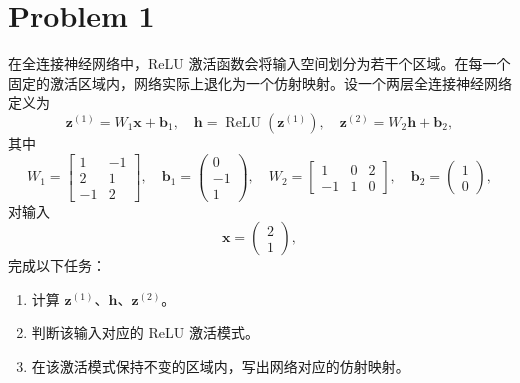 \section*{Problem 1}

在全连接神经网络中，ReLU 激活函数会将输入空间划分为若干个区域。在每一个固定的激活区域内，网络实际上退化为一个仿射映射。设一个两层全连接神经网络定义为
\[
\bm{z}^{(1)} = W_1 \bm{x} + \bm{b}_1,\quad
\bm{h} = \operatorname{ReLU}(\bm{z}^{(1)}),\quad
\bm{z}^{(2)} = W_2 \bm{h} + \bm{b}_2,
\]
其中
\[
W_1 = \begin{bmatrix}
    1 & -1 \\
    2 & 1 \\
    -1 & 2
\end{bmatrix},\quad
\bm{b}_1 = \begin{pmatrix} 0 \\ -1 \\ 1 \end{pmatrix},\quad
W_2 = \begin{bmatrix} 1 & 0 & 2 \\ -1 & 1 & 0 \end{bmatrix},\quad
\bm{b}_2 = \begin{pmatrix} 1 \\ 0 \end{pmatrix},
\]
对输入
\[
\bm{x} = \begin{pmatrix} 2 \\ 1 \end{pmatrix},
\]
完成以下任务：
\begin{enumerate}
    \item 计算 $\bm{z}^{(1)}$、$\bm{h}$、$\bm{z}^{(2)}$。
    \item 判断该输入对应的 ReLU 激活模式。
    \item 在该激活模式保持不变的区域内，写出网络对应的仿射映射。
\end{enumerate}

